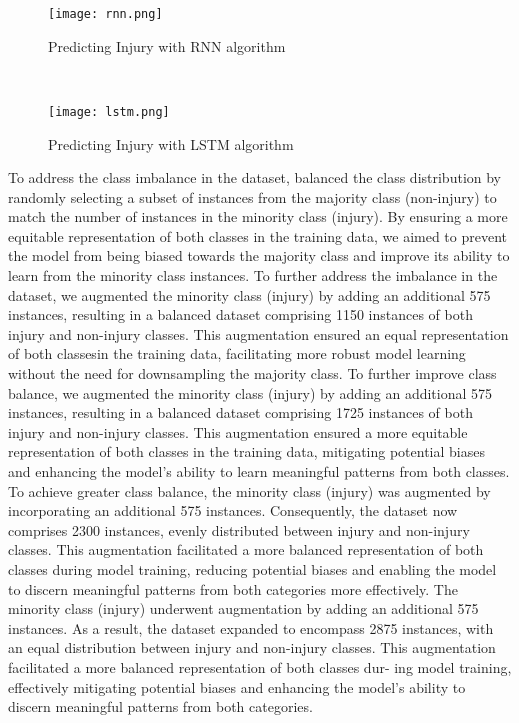\documentclass[12pt, English]{article}
\newcommand\tab[1][1cm]{\hspace*{#1}}
\begin{document}
\begin{normalsize}
\begin{figure}[htb]
\begin{center}
\texttt{[image: rnn.png]}
\end{center}
\begin{center}
\renewcommand{\thefigure}{4.2.11}
\caption{\footnotesize Predicting Injury with RNN algorithm }
\end{center}
\\
\begin{center}
\texttt{[image: lstm.png]}
\end{center}
\begin{center}
\renewcommand{\thefigure}{4.2.12}
\caption{\footnotesize Predicting Injury with LSTM algorithm}
\end{center}
\end{figure}
\tab
\newpage
\tab To address the class imbalance in the dataset, balanced the class distribution by randomly selecting a subset of instances from the majority class (non-injury) to match the number of instances in the minority class (injury). By ensuring a more equitable representation of both classes in the training data, we aimed to prevent the model from being biased towards the majority class and improve its ability to learn from the minority class instances. To further address the imbalance in the dataset, we augmented the minority class (injury) by adding an additional 575 instances, resulting in a balanced dataset comprising 1150 instances of both injury and non-injury classes. This augmentation ensured an equal representation of both classesin the training data, facilitating more robust model learning without the need for downsampling the majority class. To further improve class balance, we augmented the minority class (injury) by adding an additional 575 instances, resulting in a balanced dataset comprising 1725 instances of both injury and non-injury classes. This augmentation ensured a more equitable representation of both classes in the training data, mitigating potential biases and enhancing the model’s ability to learn meaningful patterns from both classes.\\

\tab  To achieve greater class balance, the minority class (injury) was augmented by incorporating an additional 575 instances. Consequently, the dataset now comprises 2300 instances, evenly distributed between injury and non-injury classes. This augmentation facilitated a more balanced representation of both classes during model training, reducing potential biases and enabling the model to discern meaningful patterns from both categories more effectively. The minority class (injury) underwent augmentation by adding an additional 575 instances. As a result, the dataset expanded to encompass 2875 instances, with an equal distribution between injury and non-injury classes. This augmentation facilitated a more balanced representation of both classes dur- ing model training, effectively mitigating potential biases and enhancing the model’s ability to discern meaningful patterns from both categories.\\



\end{normalsize}
\end{document}

